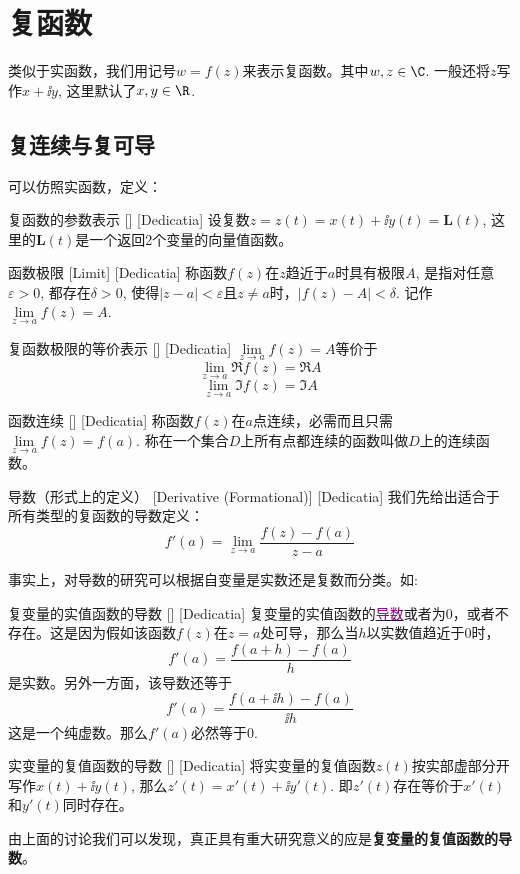 \documentclass[UTF8]{ctexart}
\newcommand{\hyperrefc}[2]{\hyperref[#1]{\textcolor{purple}{#2}}}
\begin{document}
\section{复函数}
类似于实函数，我们用记号$w=f(z)$来表示复函数。其中$w,z\in\C$. 一般还将$z$写作$x+\ii y$, 这里默认了$x,y\in\R$. 
\subsection{复连续与复可导}
可以仿照实函数，定义：
\begin{dfn}
    [UUID]
    {复函数的参数表示}
    []
    [Dedicatia]
    设复数$z=z(t)=x(t)+\ii y(t)=\bm{L}(t)$, 这里的$\bm{L}(t)$是一个返回2个变量的向量值函数。
\end{dfn}
\begin{dfn}
    [UUID]
    {函数极限}
    [Limit]
    [Dedicatia]
    称函数$f(z)$在$z$趋近于$a$时具有极限$A$, 是指对任意$\varepsilon>0$, 都存在$\delta>0$, 使得$|z-a|<\varepsilon$且$z\neq a$时，$|f(z)-A|<\delta$. 记作$\lim\limits_{z\to a}f(z)=A$.
\end{dfn}
\begin{ppt}
    [UUID]
    {复函数极限的等价表示}
    []
    [Dedicatia]
    $\lim\limits_{z\to a}f(z)=A$等价于
    \[\lim_{z\to a}\Re f(z)=\Re A\]
    \[\lim_{z\to a}\Im f(z)=\Im A\]
\end{ppt}
\begin{dfn}
    [UUID]
    {函数连续}
    []
    [Dedicatia]
    称函数$f(z)$在$a$点连续，必需而且只需$\lim\limits_{z\to a}f(z)=f(a)$. 称在一个集合$D$上所有点都连续的函数叫做$D$上的连续函数。
\end{dfn}
\begin{dfn}
    [Derivative]
    {导数（形式上的定义）}
    [Derivative (Formational)]
    [Dedicatia]
    我们先给出适合于所有类型的复函数的导数定义：
    \[f'(a)=\lim_{z\to a}\frac{f(z)-f(a)}{z-a}\]
\end{dfn}
事实上，对导数的研究可以根据自变量是实数还是复数而分类。如:
\begin{crl}
    [UUID]
    {复变量的实值函数的导数}
    []
    [Dedicatia]
    复变量的实值函数的\hyperrefc{dfn:Derivative}{导数}或者为0，或者不存在。这是因为假如该函数$f(z)$在$z=a$处可导，那么当$h$以实数值趋近于0时，
    \[f'(a)=\frac{f(a+h)-f(a)}{h}\]
    是实数。另外一方面，该导数还等于
    \[f'(a)=\frac{f(a+\ii h)-f(a)}{\ii h}\]
    这是一个纯虚数。那么$f'(a)$必然等于0.
\end{crl}
\begin{xmp}
    [UUID]
    {实变量的复值函数的导数}
    []
    [Dedicatia]
    将实变量的复值函数$z(t)$按实部虚部分开写作$x(t)+\ii y(t)$, 那么$z'(t)=x'(t)+\ii y'(t)$. 即$z'(t)$存在等价于$x'(t)$和$y'(t)$同时存在。
\end{xmp}
由上面的讨论我们可以发现，真正具有重大研究意义的应是\textbf{复变量的复值函数的导数}。
\end{document}
